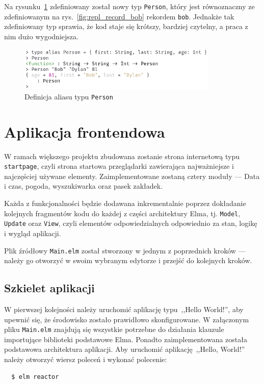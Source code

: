 \documentclass[twoside,a4paper]{report}
\begin{document}
Na rysunku~\ref{fig:repl_type_alias} zdefiniowany został nowy typ \texttt{Person}, który jest równoznaczny ze zdefiniowanym na rys.~\ref{fig:repl_record_bob} rekordem \texttt{bob}.
Jednakże tak zdefiniowany typ sprawia, że kod staje się krótszy, bardziej czytelny, a praca z nim dużo wygodniejsza.
\begin{figure}[H]
    \centering
    \includegraphics[width=0.85\textwidth]{img/repl_type_alias}
    \caption{Definicja aliasu typu \texttt{Person}}\label{fig:repl_type_alias}
\end{figure}

\section{Aplikacja frontendowa}
W ramach większego projektu zbudowana zostanie strona internetową typu \texttt{startpage}, czyli strona startowa przeglądarki zawierająca najważniejsze i najczęściej używane elementy.
Zaimplementowane zostaną cztery moduły --- Data i czas, pogoda, wyszukiwarka oraz pasek zakładek.

Każda z funkcjonalności będzie dodawana inkrementalnie poprzez dokładanie kolejnych fragmentów kodu do każdej z części architektury Elma, tj. \texttt{Model}, \texttt{Update} oraz \texttt{View}, czyli elementów odpowiedzialnych odpowiednio za stan, logikę i wygląd aplikacji.

Plik źródłowy \texttt{Main.elm} został stworzony w jednym z poprzednich kroków --- należy go otworzyć w swoim wybranym edytorze i przejść do kolejnych kroków.

\subsection{Szkielet aplikacji}
W pierwszej kolejności należy uruchomić aplikację typu~,,Hello World!'', aby upewnić się, że środowisko zostało prawidłowo skonfigurowane.
W załączonym pliku \texttt{Main.elm} znajdują się wszystkie potrzebne do działania klauzule importujące biblioteki podstawowe Elma.
Ponadto zaimplementowana została podstawowa architektura aplikacji.
Aby uruchomić aplikację~,,Hello, World!'' należy otworzyć wiersz poleceń i wykonać polecenie:

\begin{lstlisting}
  $ elm reactor
\end{lstlisting}
\end{document}
